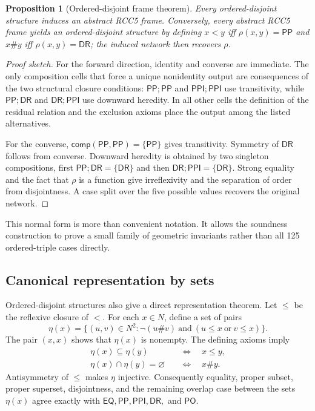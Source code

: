 \documentclass[11pt]{article}
\theoremstyle{plain}
\newtheorem{proposition}[theorem]{Proposition}
\theoremstyle{definition}
\theoremstyle{remark}
\newcommand{\EQ}{\ensuremath{\mathsf{EQ}}}
\newcommand{\PP}{\ensuremath{\mathsf{PP}}}
\newcommand{\PPI}{\ensuremath{\mathsf{PPI}}}
\newcommand{\PO}{\ensuremath{\mathsf{PO}}}
\newcommand{\DR}{\ensuremath{\mathsf{DR}}}
\newcommand{\comp}{\ensuremath{\mathsf{comp}}}
\begin{document}
\begin{proposition}[Ordered-disjoint frame theorem]
\label{prop:odframe}
Every ordered-disjoint structure induces an abstract RCC5 frame.  Conversely,
every abstract RCC5 frame yields an ordered-disjoint structure by defining
$x<y$ iff $\rho(x,y)=\PP$ and $x\#y$ iff $\rho(x,y)=\DR$; the induced network
then recovers $\rho$.
\end{proposition}

\begin{proof}[Proof sketch]
For the forward direction, identity and converse are immediate.  The only
composition cells that force a unique nonidentity output are consequences of
the two structural closure conditions: $\PP;\PP$ and $\PPI;\PPI$ use
transitivity, while $\PP;\DR$ and $\DR;\PPI$ use downward heredity.  In all
other cells the definition of the residual relation and the exclusion axioms
place the output among the listed alternatives.

For the converse, $\comp(\PP,\PP)=\{\PP\}$ gives transitivity.  Symmetry of
$\DR$ follows from converse.  Downward heredity is obtained by two singleton
compositions, first $\PP;\DR=\{\DR\}$ and then
$\DR;\PPI=\{\DR\}$.  Strong equality and the fact that $\rho$ is a function
give irreflexivity and the separation of order from disjointness.  A case split
over the five possible values recovers the original network.
\end{proof}

This normal form is more than convenient notation.  It allows the soundness
construction to prove a small family of geometric invariants rather than all
125 ordered-triple cases directly.

\subsection{Canonical representation by sets}
\label{sec:setrepresentation}

Ordered-disjoint structures also give a direct representation theorem.  Let
$\leq$ be the reflexive closure of $<$.  For each $x\in N$, define a set of
pairs
\[
 \eta(x)=\{(u,v)\in N^2 : \neg(u\#v)\ \text{and}\
                 (u\leq x\ \text{or}\ v\leq x)\}.
\]
The pair $(x,x)$ shows that $\eta(x)$ is nonempty.  The defining axioms imply
\begin{align*}
 \eta(x)\subseteq\eta(y) &\quad\Longleftrightarrow\quad x\leq y,\\
 \eta(x)\cap\eta(y)=\varnothing &\quad\Longleftrightarrow\quad x\#y.
\end{align*}
Antisymmetry of $\leq$ makes $\eta$ injective.  Consequently equality, proper
subset, proper superset, disjointness, and the remaining overlap case between
the sets $\eta(x)$ agree exactly with $\EQ,\PP,\PPI,\DR,$ and $\PO$.
\end{document}
